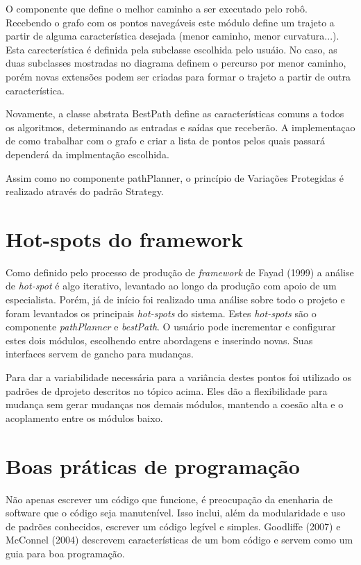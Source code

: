 O componente que define o melhor caminho a ser executado pelo robô. Recebendo o grafo com os pontos navegáveis este módulo define um trajeto a partir de alguma característica desejada (menor caminho, menor curvatura...). Esta carecterística é definida pela subclasse escolhida pelo usuáio. No caso, as duas subclasses mostradas no diagrama definem o percurso por menor caminho, porém novas extensões podem ser criadas para formar o trajeto a partir de outra característica.

Novamente, a classe abstrata BestPath define as características comuns a todos os algoritmos, determinando as entradas e saídas que receberão. A implementaçao de como trabalhar com o grafo e criar a lista de pontos pelos quais passará dependerá da implmentação escolhida.

Assim como no componente pathPlanner, o princípio de Variações Protegidas é realizado através do padrão Strategy.

\section{Hot-spots do framework}

Como definido pelo processo de produção de \textit{framework} de Fayad (1999) a análise de \textit{hot-spot} é algo iterativo, levantado ao longo da produção com apoio de um especialista. Porém, já de início foi realizado uma análise sobre todo o projeto e foram levantados os principais \textit{hot-spots} do sistema. Estes \textit{hot-spots} são o componente \textit{pathPlanner} e \textit{bestPath}. O usuário pode incrementar e configurar estes dois módulos, escolhendo entre abordagens e inserindo novas. Suas interfaces servem de gancho para mudanças.

Para dar a variabilidade necessária para a variância destes pontos foi utilizado os padrões de dprojeto descritos no tópico acima. Eles dão a flexibilidade para mudança sem gerar mudanças nos demais módulos, mantendo a coesão alta e o acoplamento entre os módulos baixo.

\section{Boas práticas de programação}

Não apenas escrever um código que funcione, é preocupação da enenharia de software que o código seja manutenível. Isso inclui, além da modularidade e uso de padrões conhecidos, escrever um código legível e simples. Goodliffe (2007) e McConnel (2004) descrevem características de um bom código e servem como um guia para boa programação.

